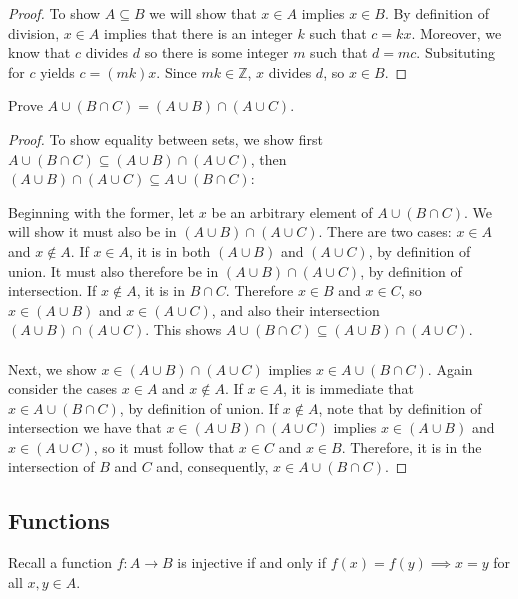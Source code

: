 \documentclass[]{exam}
\theoremstyle{definition}
\newcommand{\bb}[1]{\mathbb{#1}}
\newcommand{\Z}{\bb{Z}}
\begin{document}
\begin{questions}
\begin{proof}
To show $A \subseteq B$ we will show that $x \in A$ implies $x \in B$.
By definition of division, $x \in A$ implies that there is an integer
$k$ such that $c = kx$. Moreover, we know that $c$ divides $d$ so
there is some integer $m$ such that $d = mc$. Subsituting for
$c$ yields $c = (mk)x$. Since $mk \in \Z$, $x$ divides $d$, so $x \in B$.


\end{proof}

\question
Prove $A \cup (B \cap C) = (A \cup B) \cap (A \cup C)$.

\begin{proof}
To show equality between sets, we show first $A \cup (B \cap C) \subseteq (A
    \cup B) \cap (A \cup C)$, then 
$(A \cup B) \cap (A \cup C) \subseteq A \cup (B \cap C)$:

Beginning with the former, let $x$ be an arbitrary element of 
$A \cup (B \cap C)$. We will show it must also be in $(A \cup B) \cap (A \cup C)$. 
There are two cases: $x \in A$ and $x \notin A$. If $x \in A$, it is in both
 $(A \cup B)$ and $(A \cup C)$, by definition of union. It must also therefore
 be in $(A \cup B) \cap (A \cup C)$, by definition of intersection. If $x \notin A$, 
 it is in $B \cap C$. Therefore $x \in B$ and $x \in C$, so $x \in (A \cup B)$ and 
 $x \in (A \cup C)$, and also their intersection $(A \cup B) \cap (A \cup C)$.
This shows $A \cup (B \cap C) \subseteq (A \cup B) \cap (A \cup C)$.
\\~\\
Next, we show $x \in (A \cup B) \cap (A \cup C)$ implies 
$x \in A \cup (B \cap C)$. Again consider the cases $x \in A$ and $x \notin A$.
If $x \in A$, it is immediate that $x \in A \cup (B \cap C)$, by definition
of union. If $x \notin A$, note that by definition of intersection we have that
$x \in (A \cup B) \cap (A \cup C)$ implies $x \in (A \cup B)$ and $x \in (A \cup C)$,
so it must follow that $x \in C$ and $x \in B$. Therefore, it is in the
intersection of $B$ and $C$ and, consequently, $x \in A \cup (B \cap C)$.

\end{proof}

\subsection*{Functions}
Recall a function $f: A \to B$ is injective if and only if $f(x) = f(y) \implies
x = y$ for all $x,y \in A$.


\end{questions}
\end{document}
